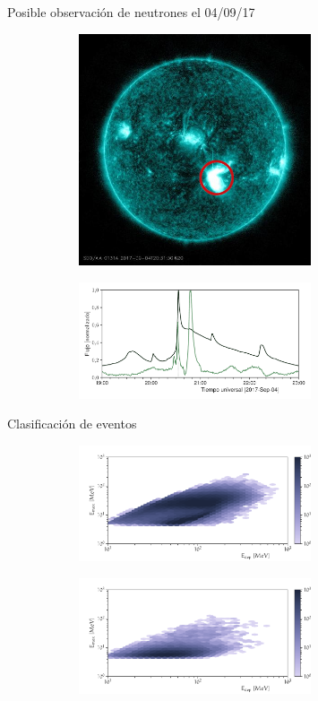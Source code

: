 \documentclass[spanish,aspectratio=169]{beamer}
\begin{document}
\begin{frame}{Posible observación de neutrones el 04/09/17}

\begin{figure}
        \begin{subfigure}[b]{0.49\textwidth}
                \includegraphics[width=6.85cm]{sdo170904-2030-13.jpg}
        \end{subfigure}
        \begin{subfigure}[b]{0.49\textwidth}
                \includegraphics[width=6.85cm]{xrays_170904.pdf}
        \end{subfigure}
\end{figure}

\end{frame}


\begin{frame}{Clasificación de eventos}

\begin{figure}
        \centering
        \begin{subfigure}[b]{0.49\textwidth}
                \includegraphics[width=6.85cm]{scibar-had.pdf}
        \end{subfigure}
        \begin{subfigure}[b]{0.49\textwidth}
                \includegraphics[width=6.85cm]{scibar-em.pdf}
        \end{subfigure}
\end{figure}

\end{frame}
\end{document}
